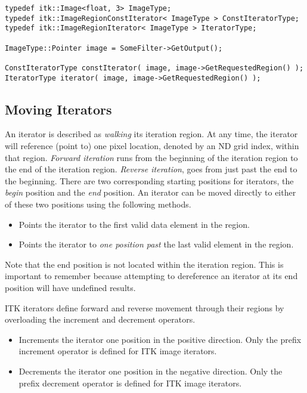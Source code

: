 \begin{verbatim}
typedef itk::Image<float, 3> ImageType;
typedef itk::ImageRegionConstIterator< ImageType > ConstIteratorType;
typedef itk::ImageRegionIterator< ImageType > IteratorType;

ImageType::Pointer image = SomeFilter->GetOutput();

ConstIteratorType constIterator( image, image->GetRequestedRegion() );
IteratorType iterator( image, image->GetRequestedRegion() );
\end{verbatim}


\subsection{Moving Iterators}
\label{sec:MovingIterators}
An iterator is described as \emph{walking} its iteration region.  At any time,
the iterator will reference (point to) one pixel location, denoted by an ND
grid index, within that region. \emph{Forward iteration} runs from the beginning of the iteration
region to the end of the iteration region.  \emph{Reverse iteration},
goes from just past the end to the beginning.  There are two
corresponding starting positions for iterators, the \emph{begin} position and
the \emph{end} position.  An iterator can be moved directly to either of these
two positions using the following methods.

\begin{itemize}
\item \textbf{} Points the iterator to the first valid
data element in the region.

\item \textbf{} Points the iterator to \emph{one position past}
the last valid element in the region.
\end{itemize}

Note that the end position is not located within the iteration region.  This is
important to remember because attempting to dereference an iterator at its end
position will have undefined results.

ITK iterators define forward and reverse movement through their regions by
overloading the increment and decrement operators.

\begin{itemize}
\item \textbf{} Increments the iterator one position in the
positive direction.  Only the prefix increment operator is defined for ITK image
iterators.

\item \textbf{} Decrements the iterator one position in the
negative direction.  Only the prefix decrement operator is defined for ITK
image iterators. 
\end{itemize}

